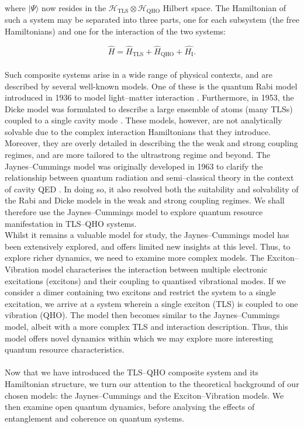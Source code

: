 \documentclass[12pt]{article}
\begin{document}
where $|\Psi\rangle$ now resides in the $\mathcal{H}_{\scriptscriptstyle \text{TLS}} \otimes\mathcal{H}_{\scriptscriptstyle \text{QHO}}$ Hilbert space. The Hamiltonian of such a system may be separated into three parts, one for each subsystem (the free Hamiltonians) and one for the interaction of the two systems:

\begin{equation}
    \hat{H} = \hat{H}_{\scriptscriptstyle \text{TLS}} + \hat{H}_{\scriptscriptstyle \text{QHO}} + \hat{H_{\scriptscriptstyle \text{I}}}.
\end{equation}
\\
Such composite systems arise in a wide range of physical contexts, and are described by several well-known models. One of these is the quantum Rabi model introduced in 1936 to model light--matter interaction \cite{Context1936-Rabi}. Furthermore, in 1953, the Dicke model was formulated to describe a large ensemble of atoms (many TLSs) coupled to a single cavity mode \cite{Context1954-Dicke}. These models, however, are not analytically solvable due to the complex interaction Hamiltonians that they introduce. Moreover, they are overly detailed in describing the the weak and strong coupling regimes, and are more tailored to the ultrastrong regime and beyond. The Jaynes--Cummings model was originally developed in 1963 to clarify the relationship between quantum radiation and semi--classical theory in the context of cavity QED \cite{Context1963-JC_Original}. In doing so, it also resolved both the suitability and solvability of the Rabi and Dicke models in the weak and strong coupling regimes. We shall therefore use the Jaynes--Cummings model to explore quantum resource manifestation in TLS--QHO systems.\\
Whilst it remains a valuable model for study, the Jaynes--Cummings model has been extensively explored, and offers limited new insights at this level. Thus, to explore richer dynamics, we need to examine more complex models. The Exciton--Vibration model characterises the interaction between multiple electronic excitations (excitons) and their coupling to quantised vibrational modes. If we consider a dimer containing two excitons and restrict the system to a single excitation, we arrive at a system wherein a single exciton (TLS) is coupled to one vibration (QHO). The model then becomes similar to the Jaynes--Cummings model, albeit with a more complex TLS and interaction description. Thus, this model offers novel dynamics within which we may explore more interesting quantum resource characteristics. \\
\\
Now that we have introduced the TLS–QHO composite system and its Hamiltonian structure, we turn our attention to the theoretical background of our chosen models: the Jaynes–Cummings and the Exciton–Vibration models. We then examine open quantum dynamics, before analysing the effects of entanglement and coherence on quantum systems.
\end{document}
